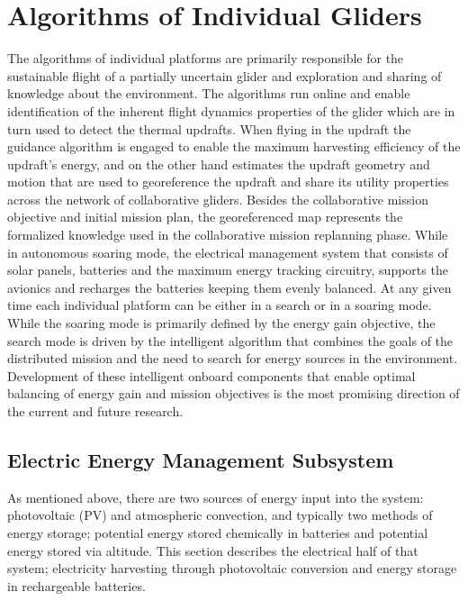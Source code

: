 \documentclass{ifacconf}
\begin{document}
\section{ Algorithms of Individual Gliders}
\label{sec:IndAlgs}

The algorithms of individual platforms are primarily responsible for the sustainable flight of a partially uncertain glider and exploration and sharing of knowledge about the environment. The algorithms run online and enable identification of the inherent flight dynamics properties of the glider which are in turn used to detect the thermal updrafts. When flying in the updraft the guidance algorithm is engaged to enable the maximum harvesting efficiency of the updraft's energy, and on the other hand estimates the updraft geometry and motion that are used to georeference the updraft and share its utility properties across the network of collaborative gliders. Besides the collaborative mission objective and initial mission plan, the georeferenced map represents the formalized knowledge used in the collaborative mission replanning phase. While in autonomous soaring mode, the electrical management system that consists of solar panels, batteries and the maximum energy tracking circuitry, supports the avionics and recharges the batteries keeping them evenly balanced. At any given time each individual platform can be either in a search or in a soaring mode. While the soaring mode is primarily defined by the energy gain objective, the search mode is driven by the intelligent algorithm that combines the goals of the distributed mission and the need to search for energy sources in the environment. Development of these intelligent onboard components that enable optimal balancing of energy gain and mission objectives is the most promising direction of the current and future research.

\subsection{Electric Energy Management Subsystem}
\label{subsec:Electric}

As mentioned above, there are two sources of energy input into the system: photovoltaic (PV) and atmospheric convection, and typically two methods of energy storage; potential energy stored chemically in batteries and potential energy stored via altitude. This section describes the electrical half of that system; electricity harvesting through photovoltaic conversion and energy storage in rechargeable batteries.
\end{document}
